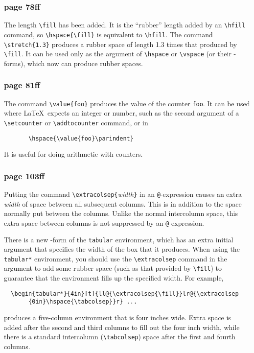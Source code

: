\subsubsection* {page 78ff}

The length \hbox{\verb|\fill|} has been added.  It is the ``rubber''
length added by an \hbox{\verb|\hfill|} command, so
\hbox{\verb|\hspace{\fill}|} is equivalent to \hbox{\verb|\hfill|}.
The command \hbox{\verb|\stretch{1.3}|} produces a rubber space of
length 1.3 times that produced by \hbox{\verb|\fill|}.  It can be used
only as the argument of \hbox{\verb|\hspace|} or \hbox{\verb|\vspace|}
(or their {\tt *}-forms), which now can produce rubber spaces.

\subsubsection*{page 81ff}

The command \hbox{\verb|\value{foo}|} produces the value of the
counter \hbox{\tt foo}.
It can be used where \LaTeX\ expects an integer or number,
such as the second argument of
a \hbox{\verb|\setcounter|} or \hbox{\verb|\addtocounter|}
command, or in
\begin{verbatim}
       \hspace{\value{foo}\parindent}
\end{verbatim}
It is useful for doing arithmetic with counters.

\subsubsection*{page 103ff}
Putting the command \hbox{\verb|\extracolsep{|{\it width\/}\verb|}|}
in an {\tt @}-expression causes an extra \hbox{\it width\/} of
space between all subsequent columns.  This is in addition to the
space normally put between the columns.  Unlike the normal intercolumn
space, this extra space between columns is not suppressed by
an {\tt @}-expression.

There is a new {\tt *}-form of the {\tt tabular} environment, which
has an extra initial argument that specifies the width of the
box that it produces.  When using the \hbox{\verb|tabular*|} environment,
you should use the \hbox{\verb|\extracolsep|} command in the argument
to add some rubber space (such as that provided by \hbox{\verb|\fill|})
to guarantee that the environment fills up the specified width.
For example,
\begin{verbatim}
  \begin{tabular*}{4in}[t]{ll@{\extracolsep{\fill}}lr@{\extracolsep
       {0in}\hspace{\tabcolsep}}r} ...
\end{verbatim}
produces a five-column environment that is four inches wide.
Extra space is added after the second and third columns to
fill out the four inch width, while there is a standard intercolumn
(\hbox{\verb"\tabcolsep"}) space after the first and fourth columns.

